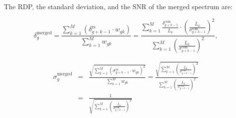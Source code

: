 %
%
%
%
%
The RDP, the standard deviation, and the SNR of the merged spectrum are:

\begin{equation}
    \delta_{g}^\text{merged} = \frac{ \sum\limits_{k = 1}^{M}\left(\delta_{g+k-1}^\text{rs} \cdot {w_{gk}}\right)}{\sum\limits_{k = 1}^{M} {w_{gk}}} = \frac{\sum\limits_{k = 1}^{M}\frac{\delta_{g+k-1}^\text{com}}{\bar{L}_{k}} \cdot \left(\frac{\bar{L}_{k}}{\sigma_{g+k-1}^\text{com}}\right)^2} {\sum\limits_{k = 1}^{M}\left(\frac{\bar{L}_{k}}{\sigma_{g+k-1}^\text{com}}\right)^2},
    \label{eq:merged_power}
\end{equation}

\begin{eqnarray}
  \sigma_{g}^\text{merged} & =  & \frac{ \sqrt{\sum\limits_{k = 1}^{M} \left(\sigma_{g+k-1}^\text{rs} \cdot {w_{gk}}\right)^2}}{\sum\limits_{k = 1}^{M} {w_{gk}}} = \frac{\sqrt{\sum\limits_{k = 1}^{M} \left(\frac{\bar{L}_{k}}{\sigma_{g+k-1}^\text{com}}\right)^2}}{\sum\limits_{k = 1}^{M} \left(\frac{\bar{L}_{k}}{\sigma_{g+k-1}^\text{com}}\right)^2}  \nonumber \\
    & = & \frac{1}{\sqrt{\sum\limits_{k = 1}^{M} \left(\frac{\bar{L}_{k}}{\sigma_{g+k-1}^\text{com}}\right)^2}}
    \label{eq:merged_sigma}
\end{eqnarray}

